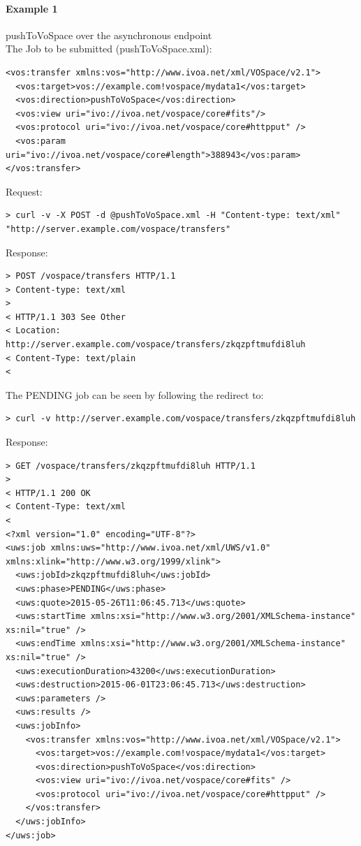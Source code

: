 \documentclass[11pt,a4paper]{ivoa}
\begin{document}
\paragraph{Example 1}
pushToVoSpace over the asynchronous endpoint
\\[5px]
\noindent
The Job to be submitted (pushToVoSpace.xml):
\begin{lstlisting}
<vos:transfer xmlns:vos="http://www.ivoa.net/xml/VOSpace/v2.1">
  <vos:target>vos://example.com!vospace/mydata1</vos:target>
  <vos:direction>pushToVoSpace</vos:direction>
  <vos:view uri="ivo://ivoa.net/vospace/core#fits"/>
  <vos:protocol uri="ivo://ivoa.net/vospace/core#httpput" />
  <vos:param uri="ivo://ivoa.net/vospace/core#length">388943</vos:param>
</vos:transfer>
\end{lstlisting}
Request:
\begin{lstlisting}
> curl -v -X POST -d @pushToVoSpace.xml -H "Content-type: text/xml" "http://server.example.com/vospace/transfers"
\end{lstlisting}
Response:
\begin{lstlisting}
> POST /vospace/transfers HTTP/1.1
> Content-type: text/xml
>
< HTTP/1.1 303 See Other
< Location: http://server.example.com/vospace/transfers/zkqzpftmufdi8luh
< Content-Type: text/plain
<
\end{lstlisting}
The PENDING job can be seen by following the redirect to:
\begin{lstlisting}
> curl -v http://server.example.com/vospace/transfers/zkqzpftmufdi8luh
\end{lstlisting}
Response:
\begin{lstlisting}
> GET /vospace/transfers/zkqzpftmufdi8luh HTTP/1.1
>
< HTTP/1.1 200 OK
< Content-Type: text/xml
<
<?xml version="1.0" encoding="UTF-8"?>
<uws:job xmlns:uws="http://www.ivoa.net/xml/UWS/v1.0" xmlns:xlink="http://www.w3.org/1999/xlink">
  <uws:jobId>zkqzpftmufdi8luh</uws:jobId>
  <uws:phase>PENDING</uws:phase>
  <uws:quote>2015-05-26T11:06:45.713</uws:quote>
  <uws:startTime xmlns:xsi="http://www.w3.org/2001/XMLSchema-instance" xs:nil="true" />
  <uws:endTime xmlns:xsi="http://www.w3.org/2001/XMLSchema-instance" xs:nil="true" />
  <uws:executionDuration>43200</uws:executionDuration>
  <uws:destruction>2015-06-01T23:06:45.713</uws:destruction>
  <uws:parameters />
  <uws:results />
  <uws:jobInfo>
    <vos:transfer xmlns:vos="http://www.ivoa.net/xml/VOSpace/v2.1">
      <vos:target>vos://example.com!vospace/mydata1</vos:target>
      <vos:direction>pushToVoSpace</vos:direction>
      <vos:view uri="ivo://ivoa.net/vospace/core#fits" />
      <vos:protocol uri="ivo://ivoa.net/vospace/core#httpput" />
    </vos:transfer>
  </uws:jobInfo>
</uws:job>
\end{lstlisting}
\end{document}
